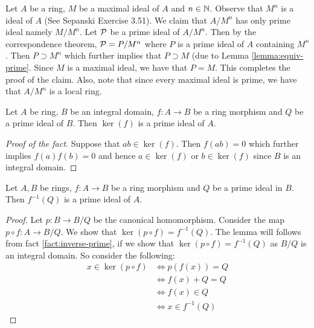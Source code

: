 \begin{example}

    Let $A$ be a ring, $M$ be a maximal ideal of $A$ and $n\in \mathbb N$. Observe that $M^n$ is a ideal of $A$ (See Sepanski Exercise 3.51). We claim that $A/ M^n$ has only prime ideal namely $M / M^n$. Let ${\cal P}$ be a prime ideal of $A / M^n$. Then by the correspondence theorem, ${\cal P} = P/ M^n$ where $P$ is a prime ideal of $A$ containing $M^n$. Then $P\supset M^n$ which further implies that $P \supset M$ (due to Lemma \ref{lemma:equiv-prime}. Since $M$ is a maximal ideal, we have that $P=M$. This completes the proof of the claim. Also, note that since every maximal ideal is prime, we have that $A/M^n$ is a local ring.

\end{example}
 
\begin{fact}
    Let $A$ be ring, $B$ be an integral domain, $f: A\to B$ be a ring morphism and $Q$ be a prime ideal of $B$. Then $\ker (f)$ is a prime ideal of $A$.
    \label{fact:inverse-prime}
\end{fact}
\begin{proof}[Proof of the fact]
    Suppose that $ab \in \ker (f)$. Then $f(ab)=0$ which further implies $f(a)f(b)=0$ and hence $a\in \ker(f)$ or $b\in\ker(f)$ since $B$ is an integral domain.
\end{proof}

\begin{lemma}
    Let $A, B$ be rings, $f:A\to B$ be a ring morphism and $Q$ be a prime ideal in $B$. Then $f^{-1} \left( Q \right)$ is a prime ideal of $A$. 
    \label{lemma:inverse-image-of-prime-ideal}
\end{lemma}
\begin{proof}
    Let $p: B \to B/Q$ be the canonical homomorphism. Consider the map $p \circ f : A \to B/Q$. We show that $\ker (p \circ f) = f^{-1} \left( Q \right)$. The lemma will follows from fact \ref{fact:inverse-prime}, if we show that $\ker (p \circ f) = f^{-1}\left( Q \right)$ as $B/Q$ is an integral domain. So consider the following:
    \begin{align*}
	x \in \ker \left( p \circ f \right) & \Leftrightarrow p (f(x)) = Q \\
					& \Leftrightarrow f(x) + Q = Q \\
					& \Leftrightarrow f(x) \in Q \\
					& \Leftrightarrow x \in f^{-1} \left( Q \right)
    \end{align*}
\end{proof}

